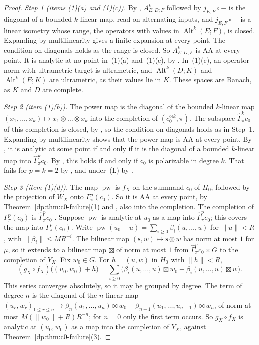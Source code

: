\documentclass[11pt]{amsart}
\theoremstyle{definition}
\theoremstyle{remark}
\numberwithin{equation}{section}
\newcommand{\Alt}{\operatorname{Alt}}
\newcommand{\norm}[1]{\lVert #1\rVert}
\theoremstyle{plain}
\theoremstyle{definition}
\theoremstyle{plain}
\newcommand{\hGamma}{\widehat\Gamma}
\begin{document}
\begin{proof}
\emph{Step 1 (items (1)(a) and (1)(c)).} By \cite[Proposition~2.2]{I}, $A^k_{E,D;F}$ followed by $j_{E,F}\circ{-}$ is the diagonal of a bounded $k$-linear map, read on alternating inputs, and $j_{E,F}\circ{-}$ is a linear isometry whose range, the operators with values in $\Alt^k(E;F)$, is closed. Expanding by multilinearity gives a finite expansion at every point. The condition on diagonals holds as the range is closed. So $A^k_{E,D;F}$ is AA at every point. It is analytic at no point in~(1)(a) and~(1)(c), by \cite[Theorem~7.2]{I}. In~(1)(c), an operator norm with ultrametric target is ultrametric, and $\Alt^k(D;K)$ and $\Alt^k(E;K)$ are ultrametric, as their values lie in $K$. These spaces are Banach, as $K$ and $D$ are complete.

\emph{Step 2 (item (1)(b)).} The power map is the diagonal of the bounded $k$-linear map $(x_1,\dots,x_k)\mapsto x_1\otimes\dots\otimes x_k$ into the completion of $(c_0^{\otimes k},\pi)$. The subspace $\hGamma^k_\pi c_0$ of this completion is closed, by \cite[Definition~3.8]{I}, so the condition on diagonals holds as in Step~1. Expanding by multilinearity shows that the power map is AA at every point. By \cite[Proposition~2.5]{I}, it is analytic at some point if and only if it is the diagonal of a bounded $k$-linear map into $\hGamma^k_\pi c_0$. By \cite[Lemma~3.11]{I}, this holds if and only if $c_0$ is polarizable in degree $k$. That fails for $p=k=2$ by \cite[Theorem~7.20(4)]{I}, and under~\textup{(L)} by \cite[Corollary~8.3]{I}.

\emph{Step 3 (item (1)(d)).} The map $\operatorname{pw}$ is $f_X$ on the summand $c_0$ of $H_0$, followed by the projection of $W_X$ onto $\Gamma^p_\pi(c_0)$. So it is AA at every point, by Theorem~\ref{dp:thm:c0-failure}(1) and \cite[Proposition~14.12(1)]{I}, also into the completion. The completion of $\Gamma^p_\pi(c_0)$ is $\hGamma^p_\pi c_0$ \cite[Section~Q.4]{I}. Suppose $\operatorname{pw}$ is analytic at $u_0$ as a map into $\hGamma^p_\pi c_0$; this covers the map into $\Gamma^p_\pi(c_0)$. Write $\operatorname{pw}(u_0+u)=\sum_{i\ge0}\beta_i(u,\dots,u)$ for $\norm u<R$, with $\norm{\beta_i}\le MR^{-i}$. The bilinear map $(\mathsf s,w)\mapsto\mathsf s\otimes w$ has norm at most $1$ for $\mu$, so it extends to a bilinear map $\boxtimes$ of norm at most $1$ from $\hGamma^p_\pi c_0\times G$ to the completion of $Y_X$. Fix $w_0\in G$. For $h=(u,w)$ in $H_0$ with $\norm h<R$,
\[
 (g_X\circ f_X)\bigl((u_0,w_0)+h\bigr)=\sum_{i\ge0}\bigl(\beta_i(u,\dots,u)\boxtimes w_0+\beta_i(u,\dots,u)\boxtimes w\bigr).
\]
This series converges absolutely, so it may be grouped by degree. The term of degree $n$ is the diagonal of the $n$-linear map $(u_r,w_r)_{1\le r\le n}\mapsto\beta_n(u_1,\dots,u_n)\boxtimes w_0+\beta_{n-1}(u_1,\dots,u_{n-1})\boxtimes w_n$, of norm at most $M(\norm{w_0}+R)R^{-n}$; for $n=0$ only the first term occurs. So $g_X\circ f_X$ is analytic at $(u_0,w_0)$ as a map into the completion of $Y_X$, against Theorem~\ref{dp:thm:c0-failure}(3).


\end{proof}
\end{document}
